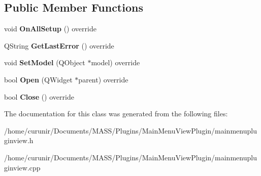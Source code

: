 \subsection*{Public Member Functions}
\begin{DoxyCompactItemize}
\item 
void {\bfseries On\+All\+Setup} () override\hypertarget{class_main_menu_plugin_view_a898a8bd2689bb67c269784ea61c46f28}{}\label{class_main_menu_plugin_view_a898a8bd2689bb67c269784ea61c46f28}

\item 
Q\+String {\bfseries Get\+Last\+Error} () override\hypertarget{class_main_menu_plugin_view_a8ac24e47204a97d5e3bbf616d6baf8bd}{}\label{class_main_menu_plugin_view_a8ac24e47204a97d5e3bbf616d6baf8bd}

\item 
void {\bfseries Set\+Model} (Q\+Object $\ast$model) override\hypertarget{class_main_menu_plugin_view_aad01cbc42d5dc1313df945e80b24f30a}{}\label{class_main_menu_plugin_view_aad01cbc42d5dc1313df945e80b24f30a}

\item 
bool {\bfseries Open} (Q\+Widget $\ast$parent) override\hypertarget{class_main_menu_plugin_view_acf1a0711a5b95bf67598aa4458916a4f}{}\label{class_main_menu_plugin_view_acf1a0711a5b95bf67598aa4458916a4f}

\item 
bool {\bfseries Close} () override\hypertarget{class_main_menu_plugin_view_aa269aebba786a16087a97cb350077c36}{}\label{class_main_menu_plugin_view_aa269aebba786a16087a97cb350077c36}

\end{DoxyCompactItemize}


The documentation for this class was generated from the following files\+:\begin{DoxyCompactItemize}
\item 
/home/curunir/\+Documents/\+M\+A\+S\+S/\+Plugins/\+Main\+Menu\+View\+Plugin/mainmenupluginview.\+h\item 
/home/curunir/\+Documents/\+M\+A\+S\+S/\+Plugins/\+Main\+Menu\+View\+Plugin/mainmenupluginview.\+cpp\end{DoxyCompactItemize}
